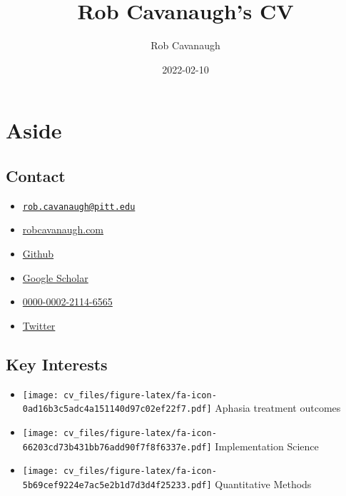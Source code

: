 \documentclass[
]{article}
\title{Rob Cavanaugh's CV}
\author{Rob Cavanaugh}
\date{2022-02-10}
\providecommand{\tightlist}{%
  \setlength{\itemsep}{0pt}\setlength{\parskip}{0pt}}
\begin{document}
\maketitle

\hypertarget{aside}{%
\section{Aside}\label{aside}}

\hypertarget{contact}{%
\subsection{Contact}\label{contact}}

\begin{itemize}
\tightlist
\item

  \href{mailto:rob.cavanaugh@pitt.edu}{\nolinkurl{rob.cavanaugh@pitt.edu}}
\item
  \href{https://robcavanaugh.com}{robcavanaugh.com}
\item
  \href{https://github.com/rbcavanaugh}{Github}
\item

  \href{https://scholar.google.com/citations?user=7pMLCJsAAAAJ\&hl=en}{Google
  Scholar}
\item
  \href{https://orcid.org/0000-0002-2114-6565}{0000-0002-2114-6565}
\item
  \href{https://twitter.com/Littlejohnsband}{Twitter}
\end{itemize}

\hypertarget{key-interests}{%
\subsection{Key Interests}\label{key-interests}}

\begin{itemize}
\item
  \texttt{[image: cv\_files/figure-latex/fa-icon-0ad16b3c5adc4a151140d97c02ef22f7.pdf]}
  Aphasia treatment outcomes
\item
  \texttt{[image: cv\_files/figure-latex/fa-icon-66203cd73b431bb76add90f7f8f6337e.pdf]}
  Implementation Science
\item
  \texttt{[image: cv\_files/figure-latex/fa-icon-5b69cef9224e7ac5e2b1d7d3d4f25233.pdf]}
  Quantitative Methods
\end{itemize}
\end{document}
